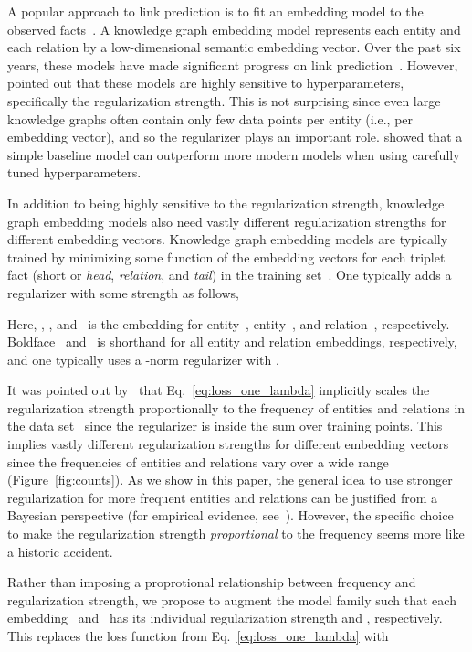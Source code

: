 \documentclass[letterpage]{article}
\begin{document}
A popular approach to link prediction is to fit an embedding model to the observed facts~\citep{KBK2017,N2017,wang2017knowledge}.
A knowledge graph embedding model represents each entity and each relation by a low-dimensional semantic embedding vector.
Over the past six years, these models have made significant progress on link prediction~\citep{BUGWY2013,BWXJL2015,NRP2016,TWR2016,LUO2018}.
However, \citet{KBK2017} pointed out that these models are highly sensitive to hyperparameters, specifically the regularization strength.
This is not surprising since even large knowledge graphs often contain only few data points per entity (i.e., per embedding vector), and so the regularizer plays an important role.
\citet{KBK2017} showed that a simple baseline model can outperform more modern models when using carefully tuned hyperparameters.

In addition to being highly sensitive to the regularization strength, knowledge graph embedding models also need vastly different regularization strengths for different embedding vectors.
Knowledge graph embedding models are typically trained by minimizing some function  of the embedding vectors for each triplet fact  (short or \emph{head}, \emph{relation}, and \emph{tail}) in the training set~.
One typically adds a regularizer with some strength  as follows,

Here, , , and~ is the embedding for entity~, entity~, and relation~, respectively.
Boldface~ and~ is shorthand for all entity and relation embeddings, respectively, and one typically uses a -norm regularizer with .

It was pointed out by~\citet{LUO2018} that Eq.~\ref{eq:loss_one_lambda} implicitly scales the regularization strength proportionally to the frequency of entities and relations in the data set~ since the regularizer is inside the sum over training points.
This implies vastly different regularization strengths for different embedding vectors since the frequencies of entities and relations vary over a wide range (Figure~\ref{fig:counts}).
As we show in this paper, the general idea to use stronger regularization for more frequent entities and relations can be justified from a Bayesian perspective (for empirical evidence, see~\citep{SS2010}).
However, the specific choice to make the regularization strength \emph{proportional} to the frequency seems more like a historic accident.

Rather than imposing a proprotional relationship between frequency and regularization strength, we propose to augment the model family such that each embedding~ and~ has its individual regularization strength  and , respectively.
This replaces the loss function from Eq.~\ref{eq:loss_one_lambda} with
\end{document}
